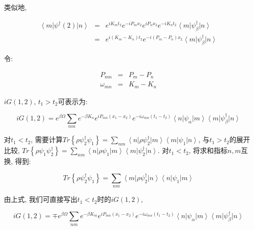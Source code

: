 类似地,

\begin{eqnarray*}
  \left\langle m \right| \psi^\dagger(2) \left| n \right\rangle &=& e^{iK_m t_2} e^{-i P_m x_2} e^{i P_n x_2} e^{-i K_n t_2}
\left\langle m \right| \psi_\beta^\dagger \left| n \right\rangle \\
  {} &=& e^{i(K_m - K_n) t_2} e^{-i (P_m - P_n) x_2 } \left\langle m
\right| \psi_\beta^\dagger \left| n \right\rangle
\end{eqnarray*}


令:

\begin{eqnarray*}
  P_{mn} &=& P_m - P_n \\
  \omega_{mn} &=& K_m - K_n
\end{eqnarray*}


$iG(1,2)$, $t_1 > t_2$可表示为:


\begin{equation*}
iG(1,2) = e^{\beta \Omega} \sum_{nm} e^{-\beta K_n} e^{iP_{mn}(x_1 -
x_2)} e^{-i\omega_{mn} (t_1 - t_2)} \left\langle n \right|
\psi_\alpha \left| m \right\rangle \left\langle m \right|
\psi_\beta^\dagger \left| n \right\rangle
\end{equation*}

对$t_1 < t_2 $, 需要计算$Tr \left\{ \rho \psi_2^\dagger \psi_1
\right\} = \sum_{nm} \left\langle n \right| \rho \psi_2^\dagger
\left| m \right\rangle \left\langle m \right| \psi_1 \left| n
\right\rangle $, 与$t_1 > t_2$的展开比较, $Tr \left\{ \rho \psi_1
\psi_2^\dagger \right\} = \sum_{nm} \left\langle n \right| \rho
\psi_1 \left| m \right\rangle \left\langle m \right| \psi_2^\dagger
\left| n \right\rangle $. 对$t_1 < t_2$, 将求和指标$n,m$互换, 得到:

\begin{equation*}
Tr \left\{ \rho \psi_2^\dagger \psi_1 \right\} = \sum_{nm}
\left\langle m \right| \rho \psi_2^\dagger \left| n \right\rangle
\left\langle n \right| \psi_1 \left| m \right\rangle
\end{equation*}

由上式, 我们可直接写出$t_1 < t_2$时的$iG(1,2)$,


\begin{equation*}
iG(1,2) = \mp e^{\beta \Omega} \sum_{nm} e^{-\beta K_m}
e^{iP_{mn}(x_1 - x_2)} e^{-i \omega_{mn}(t_1 - t_2)} \left\langle n
\right| \psi_\alpha \left| m \right\rangle \left\langle m \right|
\psi_\beta^\dagger \left| n \right\rangle
\end{equation*}

